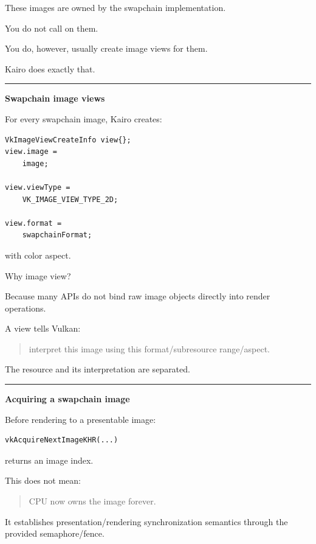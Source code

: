 These images are owned by the swapchain implementation.

You do not call  on them.

You do, however, usually create image views for them.

Kairo does exactly that.

\begin{center}\rule{0.5\linewidth}{0.5pt}\end{center}

\textbf{Swapchain image views}

For every swapchain image, Kairo creates:

\begin{verbatim}
VkImageViewCreateInfo view{};
view.image =
    image;

view.viewType =
    VK_IMAGE_VIEW_TYPE_2D;

view.format =
    swapchainFormat;
\end{verbatim}

with color aspect.

Why image view?

Because many APIs do not bind raw image objects directly into render operations.

A view tells Vulkan:

\begin{quote}
interpret this image using this format/subresource range/aspect.
\end{quote}

The resource and its interpretation are separated.

\begin{center}\rule{0.5\linewidth}{0.5pt}\end{center}

\textbf{Acquiring a swapchain image}

Before rendering to a presentable image:

\begin{verbatim}
vkAcquireNextImageKHR(...)
\end{verbatim}

returns an image index.

This does not mean:

\begin{quote}
CPU now owns the image forever.
\end{quote}

It establishes presentation/rendering synchronization semantics through the provided semaphore/fence.

